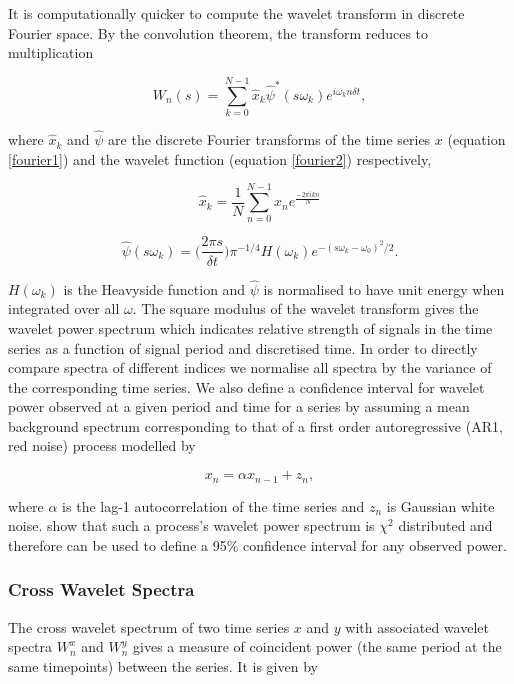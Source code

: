 \documentclass[wcd, manuscript]{copernicus}
\begin{document}
It is computationally quicker to compute the wavelet transform in discrete Fourier space. By the convolution theorem, the transform reduces to multiplication

\begin{equation} \label{wavelet_transform2}
W_n(s) = \sum^{N - 1}_{k = 0} \hat{x}_{k} \hat{\psi}^* (s\omega_k) e^{i \omega_k n \delta t},
\end{equation}

where $\hat{x}_{k}$ and $\hat{\psi}$ are the discrete Fourier transforms of the time series $x$ (equation \ref{fourier1}) and the wavelet function (equation \ref{fourier2}) respectively,

\begin{equation} \label{fourier1}
\hat{x}_k = \frac{1}{N} \sum^{N-1}_{n = 0} x_n e^{\frac{-2\pi i k n}{N}}
\end{equation}

\begin{equation} \label{fourier2}
\hat{\psi}(s\omega_k) = \bigg(\frac{2 \pi s}{\delta t}\bigg) \pi^{-1/4}H(\omega_k) e^{-(s\omega_k - \omega_0)^2/2}.
\end{equation}

$H(\omega_k)$ is the Heavyside function and $\hat{\psi}$ is normalised to have unit energy when integrated over all $\omega$. The square modulus of the wavelet transform gives the wavelet power spectrum which indicates relative strength of signals in the time series as a function of signal period and discretised time. In order to directly compare spectra of different indices we normalise all spectra by the variance of the corresponding time series. We also define a confidence interval for wavelet power observed at a given period and time for a series by assuming a mean background spectrum corresponding to that of a first order autoregressive (AR1, red noise) process modelled by

\begin{equation} \label{rednoise}
x_n = \alpha x_{n - 1} + z_n,
\end{equation}

where $\alpha$ is the lag-1 autocorrelation of the time series and $z_n$ is Gaussian white noise. \cite{Torrence1998} show that such a process's wavelet power spectrum is $\chi^2$ distributed and therefore can be used to define a 95\% confidence interval for any observed power. 

\subsubsection{Cross Wavelet Spectra}
The cross wavelet spectrum of two time series $x$ and $y$ with associated wavelet spectra $W^x_n$ and $W^y_n$ gives a measure of coincident power (the same period at the same timepoints) between the series. It is given by
\end{document}
